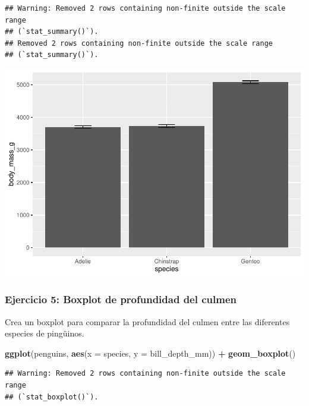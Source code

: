 \documentclass[
]{book}
\newenvironment{Shaded}{\begin{snugshade}}{\end{snugshade}}
\newcommand{\AttributeTok}[1]{\textcolor[rgb]{0.13,0.29,0.53}{#1}}
\newcommand{\FunctionTok}[1]{\textcolor[rgb]{0.13,0.29,0.53}{\textbf{#1}}}
\newcommand{\NormalTok}[1]{#1}
\newcommand{\SpecialCharTok}[1]{\textcolor[rgb]{0.81,0.36,0.00}{\textbf{#1}}}
\begin{document}
\begin{verbatim}
## Warning: Removed 2 rows containing non-finite outside the scale range
## (`stat_summary()`).
## Removed 2 rows containing non-finite outside the scale range
## (`stat_summary()`).
\end{verbatim}

\includegraphics{bookdown-demo_files/figure-latex/unnamed-chunk-184-1.pdf}

\subsubsection{Ejercicio 5: Boxplot de profundidad del culmen}\label{ejercicio-5-boxplot-de-profundidad-del-culmen}

Crea un boxplot para comparar la profundidad del culmen entre las diferentes especies de pingüinos.

\begin{Shaded}
\begin{Highlighting}[]
\FunctionTok{ggplot}\NormalTok{(penguins, }\FunctionTok{aes}\NormalTok{(}\AttributeTok{x =}\NormalTok{ species, }\AttributeTok{y =}\NormalTok{ bill\_depth\_mm)) }\SpecialCharTok{+}
  \FunctionTok{geom\_boxplot}\NormalTok{()}
\end{Highlighting}
\end{Shaded}

\begin{verbatim}
## Warning: Removed 2 rows containing non-finite outside the scale range
## (`stat_boxplot()`).
\end{verbatim}
\end{document}
